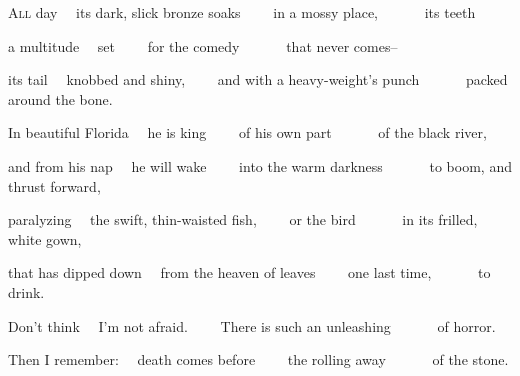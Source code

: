 
\begin{poem}
\begin{stanza}
\textsc{All} day\verseline
~~its dark, slick bronze soaks\verseline
~~~~in a mossy place,\verseline
~~~~~~its teeth
\end{stanza}

\begin{stanza}
a multitude\verseline
~~set\verseline
~~~~for the comedy\verseline
~~~~~~that never comes--
\end{stanza}

\begin{stanza}
its tail\verseline
~~knobbed and shiny,\verseline
~~~~and with a heavy-weight's punch\verseline
~~~~~~packed around the bone.
\end{stanza}

\begin{stanza}
In beautiful Florida\verseline
~~he is king\verseline
~~~~of his own part\verseline
~~~~~~of the black river,
\end{stanza}

\begin{stanza}
and from his nap\verseline
~~he will wake\verseline
~~~~into the warm darkness\verseline
~~~~~~to boom, and thrust forward,
\end{stanza}

\begin{stanza}
paralyzing\verseline
~~the swift, thin-waisted fish,\verseline
~~~~or the bird\verseline
~~~~~~in its frilled, white gown,
\end{stanza}

\begin{stanza}
that has dipped down\verseline
~~from the heaven of leaves\verseline
~~~~one last time,\verseline
~~~~~~to drink.
\end{stanza}

\begin{stanza}
Don't think\verseline
~~I'm not afraid.\verseline
~~~~There is such an unleashing\verseline
~~~~~~of horror.
\end{stanza}

\begin{stanza}
Then I remember:\verseline
~~death comes before\verseline
~~~~the rolling away\verseline
~~~~~~of the stone.
\end{stanza}
\end{poem}
